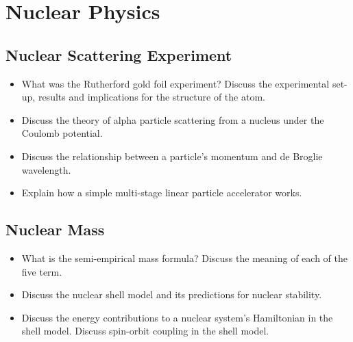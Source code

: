 \section{Nuclear Physics}

\subsection{Nuclear Scattering Experiment}
\begin{itemize}
	\item What was the Rutherford gold foil experiment?
    Discuss the experimental set-up, results and implications for the structure of the atom.
    
    \item Discuss the theory of alpha particle scattering from a nucleus under the Coulomb potential.
	
	\item Discuss the relationship between a particle's momentum and de Broglie wavelength.
	
	\item Explain how a simple multi-stage linear particle accelerator works.
	
\end{itemize}

\subsection{Nuclear Mass}
\begin{itemize}
	\item What is the semi-empirical mass formula?
    Discuss the meaning of each of the five term. 
	
	\item Discuss the nuclear shell model and its predictions for nuclear stability. 
	
	\item Discuss the energy contributions to a nuclear system's Hamiltonian in the shell model.
    Discuss spin-orbit coupling in the shell model.
	
\end{itemize}

